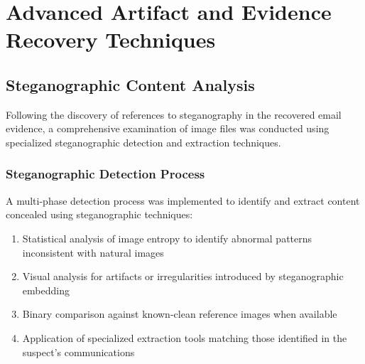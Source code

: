 \chapter{Advanced Artifact and Evidence Recovery Techniques}

\section{Steganographic Content Analysis}
Following the discovery of references to steganography in the recovered email evidence, a comprehensive examination of image files was conducted using specialized steganographic detection and extraction techniques.

\subsection{Steganographic Detection Process}
A multi-phase detection process was implemented to identify and extract content concealed using steganographic techniques:

\begin{enumerate}
    \item Statistical analysis of image entropy to identify abnormal patterns inconsistent with natural images
    \item Visual analysis for artifacts or irregularities introduced by steganographic embedding
    \item Binary comparison against known-clean reference images when available
    \item Application of specialized extraction tools matching those identified in the suspect's communications
\end{enumerate}


